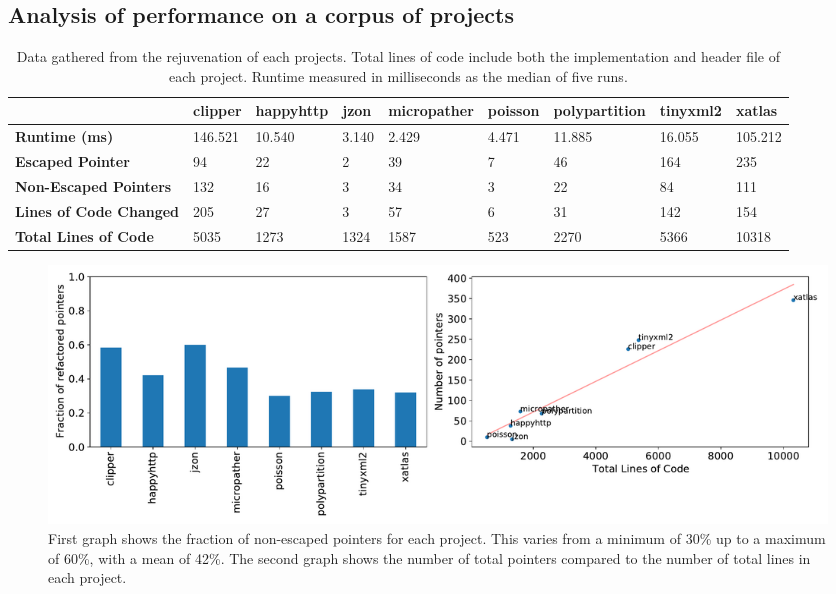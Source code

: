 \documentclass{mpaper}
\begin{document}
    \subsection{Analysis of performance on a corpus of projects}
    
    \begin{table}
        \begin{tabular}{|l|l|l|l|l|l|l|l|l|}
        \hline
                                        & \textbf{clipper} & \textbf{happyhttp} & \textbf{jzon} & \textbf{micropather} & \textbf{poisson} & \textbf{polypartition} & \textbf{tinyxml2} & \textbf{xatlas} \\ \hline \hline
        \textbf{Runtime (ms)}          & 146.521          & 10.540             & 3.140                & 2.429         & 4.471            & 11.885                 & 16.055            & 105.212         \\ \hline
        \textbf{Escaped Pointer}       & 94               & 22                 & 2                    & 39            & 7                & 46                     & 164               & 235             \\ \hline
        \textbf{Non-Escaped Pointers}  & 132              & 16                 & 3                    & 34            & 3                & 22                     & 84                & 111             \\ \hline
        \textbf{Lines of Code Changed}   & 205             & 27                 & 3                    & 57            & 6                & 31                     & 142               & 154             \\ \hline
        \textbf{Total Lines of Code} & 5035             & 1273               & 1324                 & 1587          & 523              & 2270                   & 5366              & 10318           \\ \hline
        \end{tabular}    
        \caption{Data gathered from the rejuvenation of each projects. Total lines of code include both the implementation and header file of each project. Runtime measured in milliseconds as the median of five runs.}
        \label{table:data}
    \end{table}
    
    \begin{figure}
        \centering
        \includegraphics[scale=0.45]{images/pointers.pdf}
        \caption{First graph shows the fraction of non-escaped pointers for each project. This varies from a minimum of 30\% up to a maximum of 60\%, with a mean of 42\%. The second graph shows the number of total pointers compared to the number of total lines in each project.}
        \label{fig:ratio-pointer}
    \end{figure}
    
\end{document}
